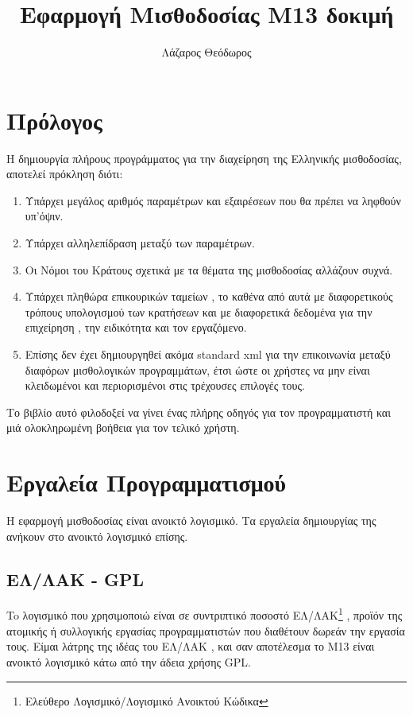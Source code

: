 \documentclass[A4,10pt,greek]{book}
\title{Εφαρμογή Μισθοδοσίας M13 δοκιμή}
\author{Λάζαρος Θεόδωρος}
\begin{document}
\maketitle

\tableofcontents

\frontmatter
\chapter{Πρόλογος}
Η δημιουργία πλήρους προγράμματος για την διαχείρηση της Ελληνικής μισθοδοσίας, αποτελεί πρόκληση διότι:
\begin{enumerate}
\item Υπάρχει μεγάλος αριθμός παραμέτρων και εξαιρέσεων που θα πρέπει να ληφθούν υπ'όψιν.
\item Υπάρχει αλληλεπίδραση μεταξύ των παραμέτρων.
\item Οι Νόμοι του Κράτους σχετικά με τα θέματα της μισθοδοσίας αλλάζουν συχνά. 
\item Υπάρχει πληθώρα επικουρικών ταμείων , το καθένα από αυτά με διαφορετικούς τρόπους υπολογισμού των κρατήσεων και με διαφορετικά δεδομένα για την επιχείρηση , την ειδικότητα και τον εργαζόμενο.
\item Επίσης δεν έχει δημιουργηθεί ακόμα standard xml για την επικοινωνία μεταξύ διαφόρων μισθολογικών προγραμμάτων, έτσι ώστε οι χρήστες να μην είναι κλειδωμένοι και περιορισμένοι στις τρέχουσες επιλογές τους.  

\end{enumerate}

Το βιβλίο αυτό φιλοδοξεί να γίνει ένας πλήρης οδηγός για τον προγραμματιστή και μιά ολοκληρωμένη βοήθεια για τον τελικό χρήστη. 

\mainmatter
\chapter{ Εργαλεία Προγραμματισμού}
Η εφαρμογή μισθοδοσίας είναι ανοικτό λογισμικό. Τα εργαλεία δημιουργίας της ανήκουν στο ανοικτό λογισμικό επίσης.

\section{ΕΛ/ΛΑΚ - GPL }
 To λογισμικό που χρησιμοποιώ είναι σε συντριπτικό ποσοστό ΕΛ/ΛΑΚ\footnote{Ελεύθερο Λογισμικό/Λογισμικό Ανοικτού Κώδικα} , προϊόν της ατομικής ή συλλογικής εργασίας προγραμματιστών που διαθέτουν δωρεάν την εργασία τους. Είμαι λάτρης της ιδέας του ΕΛ/ΛΑΚ , και σαν αποτέλεσμα το M13 είναι ανοικτό λογισμικό κάτω από την άδεια χρήσης GPL. 
\end{document}
